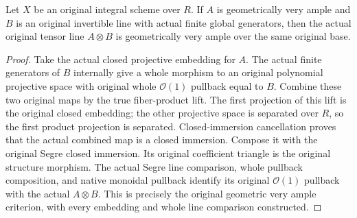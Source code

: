 \begin{theorem}
\label{thm:fc-original-very-ample-tensor-generated}
\leanok
{}
Let $X$ be an original integral scheme over $R$. If $A$ is geometrically
very ample and $B$ is an original invertible line with actual finite
global generators, then the actual original tensor line $A\otimes B$
is geometrically very ample over the same original base.
\end{theorem}
\begin{proof}
Take the actual closed projective embedding for $A$. The actual finite
generators of $B$ internally give a whole morphism to an original
polynomial projective space with original whole $\mathcal O(1)$
pullback equal to $B$. Combine these two original maps by the true
fiber-product lift. The first projection of this lift is the original
closed embedding; the other projective space is separated over $R$,
so the first product projection is separated. Closed-immersion
cancellation proves that the actual combined map is a closed immersion.
Compose it with the original Segre closed immersion. Its original
coefficient triangle is the original structure morphism. The actual
Segre line comparison, whole pullback composition, and native monoidal
pullback identify its original $\mathcal O(1)$ pullback with the actual
$A\otimes B$. This is precisely the original geometric very ample
criterion, with every embedding and whole line comparison constructed.
\end{proof}
